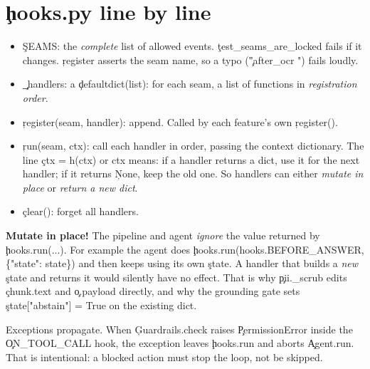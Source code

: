\section{\c{hooks.py} line by line}
\begin{itemize}
 \item \c{SEAMS}: the \emph{complete} list of allowed events. \c{test\_seams\_are\_locked} fails if it changes. \c{register} asserts the seam name, so a typo (\c{"after\_ocr "}) fails loudly.
 \item \c{\_handlers}: a \c{defaultdict(list)}: for each seam, a list of functions in \emph{registration order}.
 \item \c{register(seam, handler)}: append. Called by each feature's own \c{register()}.
 \item \c{run(seam, ctx)}: call each handler in order, passing the context dictionary. The line \c{ctx = h(ctx) or ctx} means: if a handler returns a dict, use it for the next handler; if it returns \c{None}, keep the old one. So handlers can either \emph{mutate in place} or \emph{return a new dict}.
 \item \c{clear()}: forget all handlers.
\end{itemize}

\begin{gotcha}
\textbf{Mutate in place!} The pipeline and agent \emph{ignore} the value returned by \c{hooks.run(...)}. For example the agent does
\c{hooks.run(hooks.BEFORE\_ANSWER, \{"state": state\})} and then keeps using its own \c{state}. A handler that builds a \emph{new} \c{state} and returns it would silently have no effect. That is why \c{pii.\_scrub} edits \c{chunk.text} and \c{o.payload} directly, and why the grounding gate sets \c{state["abstain"] = True} on the existing dict.
\end{gotcha}
\begin{gotcha}
Exceptions propagate. When \c{Guardrails.check} raises \c{PermissionError} inside the \c{ON\_TOOL\_CALL} hook, the exception leaves \c{hooks.run} and aborts \c{Agent.run}. That is intentional: a blocked action must stop the loop, not be skipped.
\end{gotcha}

